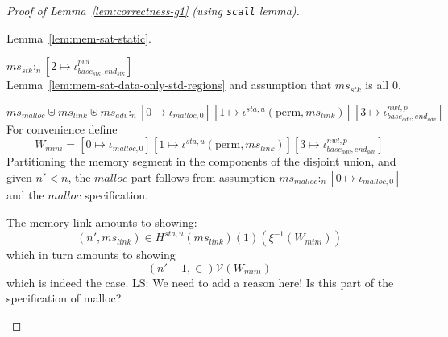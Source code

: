 \documentclass[a4paper]{article}
\newcommand\lau[1]{{\color{purple} \sf \footnotesize {LS: #1}}\\}
\newcommand{\var}[1]{\mathit{#1}}
\newcommand{\hs}{\var{ms}}
\newcommand{\ms}{\hs}
\newcommand{\start}{\var{base}}
\newcommand{\addrend}{\var{end}}
\newcommand{\heap}{\var{mem}}
\newcommand{\adv}{\var{adv}}
\newcommand{\link}{\var{link}}
\newcommand{\stk}{\var{stk}}
\newcommand{\nwl}{\var{nwl}}
\newcommand{\pwl}{\var{pwl}}
\newcommand{\sta}{\var{sta}}
\newcommand{\heapSat}[3][\heap]{#1 :_{#2} #3}
\newcommand{\memSat}[3][n]{\heapSat[#2]{#1}{#3}}
\newcommand{\codelabel}[1]{\mathit{#1}}
\newcommand{\malloc}{\codelabel{malloc}}
\newcommand{\asmType}{\plaindom{AsmType}}
\newcommand{\plaindom}[1]{\mathrm{#1}}
\newcommand{\intr}[2]{\mathcal{#1}}
\newcommand{\valueintr}[1]{\intr{V}{#1}}
\newcommand{\stdvr}{\valueintr{\asmType}}
\newcommand{\npair}[2][n]{\left(#1,#2 \right)}
\newcommand{\plainview}[1]{\mathrm{#1}}
\newcommand{\perma}{\plainview{perm}}
\begin{document}
\begin{proof}[Proof of Lemma~\ref{lem:correctness-g1} (using \texttt{scall} lemma)]
\begin{enumproof}[resume]
\begin{enumproof}
          Lemma~\ref{lem:mem-sat-static}.
        \item $\memSat{\ms_\stk}{[2 \mapsto \iota^\pwl_{\start_\stk,\addrend_\stk}]}$\\
          Lemma~\ref{lem:mem-sat-data-only-std-regions} and assumption that $\ms_\stk$ is all 0.
        \item $\memSat{\ms_{\malloc} \uplus \ms_\link \uplus \ms_\adv}{[0 \mapsto \iota_{\malloc,0}][1 \mapsto \iota^{\sta,u} (\perma,\ms_\link)][3 \mapsto \iota^{\nwl,p}_{\start_\adv,\addrend_\adv}]}$\\
          For convenience define
          \[
            W_{\var{mini}} = [0 \mapsto \iota_{\malloc,0}][1 \mapsto \iota^{\sta,u} (\perma,\ms_\link)][3 \mapsto \iota^{\nwl,p}_{\start_\adv,\addrend_\adv}]
          \]
          Partitioning the memory segment in the components of the disjoint union, and given $n' < n$, the $\malloc$ part follows from assumption $\memSat{\ms_\malloc}{[0 \mapsto \iota_{\malloc,0}]}$ and the $\malloc$ specification.

          The memory link amounts to showing:
          \[
            \npair[n']{\ms_\link} \in H^{\sta,u}(\ms_\link)(1)(\xi^{-1}(W_{\var{mini}}))
          \]
          which in turn amounts to showing
          \[
            \npair[n'-1] \in \stdvr(W_{\var{mini}})
          \]
          which is indeed the case. \lau{We need to add a reason here! Is this part of the specification of malloc?}


\end{enumproof}
\end{enumproof}
\end{proof}
\end{document}

